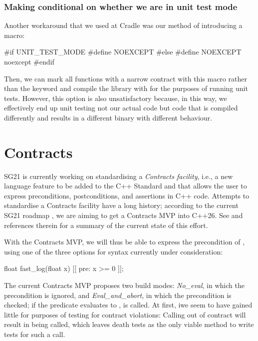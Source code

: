 \subsubsection{Making  conditional on whether we are in unit test mode}

Another workaround that we used at Cradle was our method of introducing a macro:
\begin{codeblock}
#if UNIT_TEST_MODE
  #define NOEXCEPT 
#else
  #define NOEXCEPT noexcept
#endif
\end{codeblock}
Then, we can mark all functions with a narrow contract with this  macro rather than the  keyword and compile the library with  for the purposes of running unit tests. However, this option is also unsatisfactory because, in this way, we effectively end up unit testing not our actual code but code that is compiled differently and results in a different binary with different behaviour.

\section{Contracts}
\label{sec:contracts}

SG21 is currently working on standardising a \emph{Contracts facility}, i.e., a new language feature to be added to the C++ Standard and that allows the user to express preconditions, postconditions, and assertions in C++ code. Attempts to standardise a Contracts facility have a long history; according to the current SG21 roadmap \cite{P2695R1}, we are aiming to get a Contracts MVP into C++26. See \cite{P2521R3} and references therein for a summary of the current state of this effort.

With the Contracts MVP, we will thus be able to express the precondition of , using one of the three options for syntax currently under consideration:
\begin{codeblock}
float fast_log(float x) [[ pre: x >= 0 ]];
\end{codeblock}

The current Contracts MVP proposes two build modes: \emph{No_eval}, in which the precondition is ignored, and \emph{Eval_and_abort}, in which the precondition is checked; if the predicate evaluates to ,  is called. At first, iwe seem to have gained little for purposes of testing for contract violations: Calling  out of contract will result in  being called, which leaves death tests as the only viable method to write tests for such a call.

